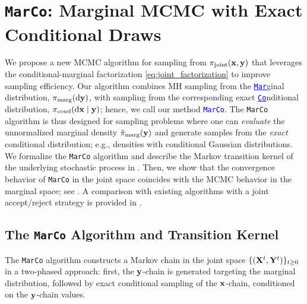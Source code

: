 \documentclass[onefignum,onetabnum]{siamonline250211}
\renewcommand{\d} {{\rm d}}                                %
\newcommand{\bfX}{{\bf X}}
\newcommand{\bfY}{{\bf Y}}
\newcommand{\bfx}{{\bf x}}
\newcommand{\bfy}{{\bf y}}
\newcommand{\pjoint}{\pi_{\rm joint}}
\newcommand{\pcond}{\pi_{\rm cond}}
\newcommand{\MarCo}{\textnormal{\texttt{MarCo}}\xspace}
\begin{document}
%

%

%
%
%
%
%
%
%
%
%
%
%
%
%
%
%
%

%
%
%
%
%
%
%

%
 
%
\section{\MarCo: Marginal MCMC with Exact Conditional Draws}
\label{sec:methodology}
We propose a new MCMC algorithm for sampling from $\pjoint(\bfx, \bfy)$ 
that leverages the conditional-marginal factorization \cref{eq:joint_factorization} to improve sampling efficiency. 
Our algorithm combines MH sampling from the \textcolor{blue}{\underline{\texttt{Mar}}}ginal distribution, ${\pi}_{\rm marg}(\d\bfy)$, with sampling from the corresponding exact \textcolor{blue}{\underline{\texttt{Co}}}nditional distribution, $\pcond(\d\bfx \mid \bfy)$; hence, we call our method \textcolor{blue}{\MarCo}.
The \MarCo algorithm is thus designed for sampling problems where
%
one can \emph{evaluate} the unnormalized marginal density $\tilde\pi_{\rm marg}(\bfy)$ and generate samples from the \emph{exact} conditional distribution; e.g., densities with conditional Gaussian distributions. 
%
%
We formalize the \MarCo algorithm and describe the Markov transition kernel of the underlying stochastic process in . Then, we show that the convergence behavior of \MarCo in the joint space coincides with the MCMC behavior in the marginal space; see . A comparison with existing algorithms with a joint accept/reject strategy is provided in .  

%
%

\subsection{The \MarCo Algorithm and Transition Kernel}
\label{sec:marco_algorithm}

The \MarCo algorithm constructs a Markov chain in the joint space $\{(\bfX^t, \bfY^t)\}_{t \ge 0}$ %
%
%
in a two-phased approach: first, the $\bfy$-chain is generated targeting the marginal distribution, followed by exact conditional sampling of the $\bfx$-chain, conditioned on the $\bfy$-chain values.
\end{document}
